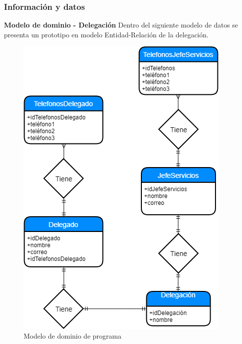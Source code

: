 \hypertarget{cap:infoydats}{}
\subsubsection{Información y datos}
\textbf{Modelo de dominio - Delegación}
Dentro del siguiente modelo de datos se presenta un prototipo en modelo Entidad-Relación de la delegación.

\begin{figure}[htbp!]
	\begin{center}
	\includegraphics[width=.60\textwidth]{images/capitulo3/ModeloDominio.png}
		\caption{Modelo de dominio de programa}
		\label{InfoyDatos:ModeloDominio}
	\end{center}
\end{figure}
\clearpage